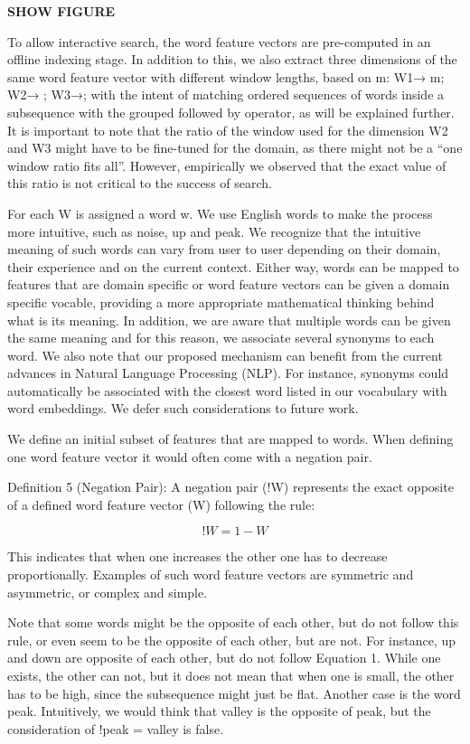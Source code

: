 {\textbf{SHOW FIGURE}

To allow interactive search, the word feature vectors are pre-computed in an offline indexing stage. In addition to this, we also extract three dimensions of the same word feature vector with different window lengths, based on m: W1→ m; W2→ ; W3→; with the intent of matching ordered sequences of words inside a subsequence with the grouped followed by operator, as will be explained further. It is important to note that the ratio of the window used for the dimension W2 and W3 might have to be fine-tuned for the domain, as there might not be a “one window ratio fits all”. However, empirically we observed that the exact value of this ratio is not critical to the success of search.

For each W is assigned a word w. We use English words to make the process more intuitive, such as noise, up and peak. We recognize that the intuitive meaning of such words can vary from user to user depending on their domain, their experience and on the current context. Either way, words can be mapped to features that are domain specific or word feature vectors can be given a domain specific vocable, providing a more appropriate mathematical thinking behind what is its meaning. In addition, we are aware that multiple words can be given the same meaning and for this reason, we associate several synonyms to each word. We also note that our proposed mechanism can benefit from the current advances in Natural Language Processing (NLP). For instance, synonyms could automatically be associated with the closest word listed in our vocabulary with word embeddings. We defer such considerations to future work.

We define an initial subset of features that are mapped to words. When defining one word feature vector it would often come with a negation pair.

Definition 5 (Negation Pair): A negation pair (!W) represents the exact opposite of a defined word feature vector (W) following the rule:

\begin{equation}
!W = 1-W
\end{equation}


This indicates that when one increases the other one has to decrease proportionally. Examples of such word feature vectors are symmetric and asymmetric, or complex and simple. 

Note that some words might be the opposite of each other, but do not follow this rule, or even seem to be the opposite of each other, but are not. For instance, up and down are opposite of each other, but do not follow Equation 1. While one exists, the other can not, but it does not mean that when one is small, the other has to be high, since the subsequence might just be flat. Another case is the word peak. Intuitively, we would think that valley is the opposite of peak, but the consideration of !peak = valley is false. 

}
